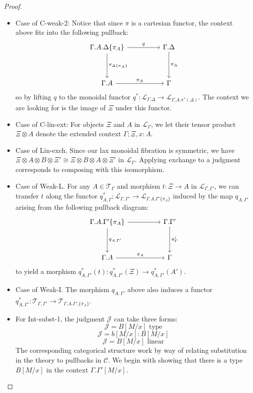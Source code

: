 \documentclass[a4paper,english]{lipics-v2018}
\begin{document}
\begin{theorem}
\begin{proof}
\begin{itemize}
\item Case of C-weak-2: Notice that since $\pi$ is a cartesian functor, the context above fits into the following pullback:
\[
\begin{tikzcd}[row sep=huge, column sep=huge]
\Gamma.A.\Delta\{\pi_A\} \ar[r, "q"] \ar[d, "\pi_{\Delta\{\pi_A\}}"]  & \Gamma.\Delta \ar[d, "\pi_\Delta"]\\
\Gamma.A \ar[r, "\pi_A"] & \Gamma
\end{tikzcd}
\]
so by lifting $q$ to the monoidal functor $q^* : \mathcal{L}_{\Gamma.\Delta} \to \mathcal{L}_{\Gamma.A.\pi^*(\Delta)}$. The context we are looking for is the image of $\Xi$ under this functor.
\item Case of C-lin-ext: For objects $\Xi$ and $A$ in $\mathcal{L}_{\Gamma}$, we let their tensor product $\Xi \otimes A$ denote the extended context $\Gamma; \Xi, x : A$.
\item Case of Lin-exch. Since our lax monoidal fibration is symmetric, we have $\Xi \otimes A \otimes B \otimes \Xi' \cong \Xi \otimes B \otimes A \otimes \Xi'$ in $\mathcal{L}_{\Gamma}$. Applying exchange to a judgment corresponds to composing with this isomorphism.
\item Case of Weak-L. For any $A \in \mathcal{T}_{\Gamma}$ and morphism $t : \Xi \to A$ in $\mathcal{L}_{\Gamma, \Gamma'}$, we can transfer $t$ along the functor $q_{A, \Gamma}^* : \mathcal{L}_{\Gamma, \Gamma'} \to \mathcal{L}_{\Gamma.A.\Gamma'\{\pi_A\}}$ induced by the map $q_{A, \Gamma'}$ arising from the following pullback diagram:
\[
\begin{tikzcd}[row sep=huge, column sep=huge]
\Gamma.A.\Gamma'\{\pi_A\} \ar[r] \ar[d, "q_{A, \Gamma'}"]  & \Gamma.\Gamma' \ar[d, "\pi_\Gamma'"]\\
\Gamma.A \ar[r, "\pi_A"] & \Gamma
\end{tikzcd}
\]
to yield a morphism $q_{A, \Gamma'}^*(t) : q_{A, \Gamma'}^*(\Xi) \to q_{A, \Gamma'}^*(A')$.
\item Case of Weak-I. The morphism $q_{A, \Gamma'}$ above also induces a functor $q_{A, \Gamma'}^* : \mathcal{T}_{\Gamma, \Gamma'} \to \mathcal{T}_{\Gamma.A.\Gamma'.\{\pi_A\}}$.
\item For Int-subst-1, the judgment $\mathcal{J}$ can take three forms:
\[
\mathcal{J} = B[M/x] \text{ type}
\]
\[
\mathcal{J} = b[M/x] : B[M/x]
\]
\[
\mathcal{J} = B[M/x] \text{ linear}
\]
The corresponding categorical structure work by way of relating substitution in the theory to pullbacks in $\mathcal{C}$. We begin with showing that there is a type $B[M/x]$ in the context $\Gamma. \Gamma'[M/x]$.



\end{itemize}
\end{proof}
\end{theorem}
\end{document}
